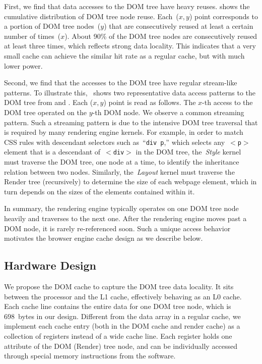 First, we find that data accesses to the DOM tree have heavy reuses.  shows the cumulative distribution of DOM tree node reuse. Each~($x, y$) point corresponds to a portion of DOM tree nodes~($y$) that are consecutively reused at least a certain number of times~($x$). About 90\% of the DOM tree nodes are consecutively reused at least three times, which reflects strong data locality. This indicates that a very small cache can achieve the similar hit rate as a regular cache, but with much lower power.

Second, we find that the accesses to the DOM tree have regular stream-like patterns. To illustrate this,~ shows two representative data access patterns to the DOM tree from  and . Each ($x, y$) point is read as follows. The $x$-th access to the DOM tree operated on the $y$-th DOM node. We observe a common streaming pattern. Such a streaming pattern is due to the intensive DOM tree traversal that is required by many rendering engine kernels. For example, in order to match CSS rules with descendant selectors such as~``\texttt{div p},'' which selects any~\texttt{$<$p$>$} element that is a descendant of~\texttt{$<$div$>$} in the DOM tree, the~\textit{Style} kernel must traverse the DOM tree, one node at a time, to identify the inheritance relation between two nodes. Similarly, the~\textit{Layout} kernel must traverse the Render tree (recursively) to determine the size of each webpage element, which in turn depends on the sizes of the elements contained within it.

In summary, the rendering engine typically operates on one DOM tree node heavily and traverses to the next one. After the rendering engine moves past a DOM node, it is rarely re-referenced soon. Such a unique access behavior motivates the browser engine cache design as we describe below.

\subsection{Hardware Design}
\label{sec:cache:hw}

We propose the DOM cache to capture the DOM tree data locality. It sits between the processor and the L1 cache, effectively behaving as an L0 cache. Each cache line contains the entire data for one DOM tree node, which is 698~bytes in our design. Different from the data array in a regular cache, we implement each cache entry (both in the DOM cache and render cache) as a collection of registers instead of a wide cache line.  Each register holds one attribute of the DOM (Render) tree node, and can be individually accessed through special memory instructions from the software.

